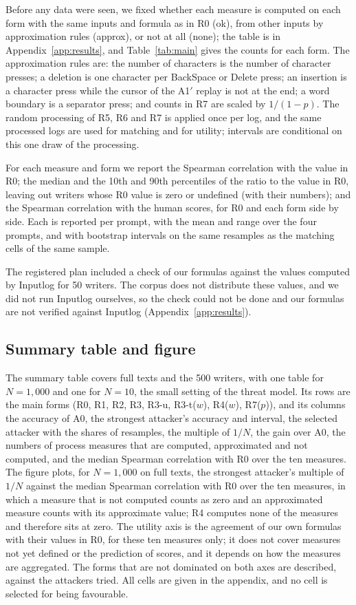 Before any data were seen, we fixed whether each measure is computed on each form with the same
inputs and formula as in R0 (ok), from other inputs by approximation rules (approx), or not at all (none); the table is in Appendix~\ref{app:results}, and Table~\ref{tab:main} gives the counts for each form. The
approximation rules are: the number of characters is the number of character presses; a deletion is one character per
BackSpace or Delete press; an insertion is a character press while the cursor of the A1$'$ replay is not at the end; a
word boundary is a separator press; and counts in R7 are scaled by $1/(1-p)$. The random processing of R5, R6 and R7
is applied once per log, and the same processed logs are used for matching and for utility; intervals are
conditional on this one draw of the processing.

For each measure and form we report the Spearman correlation with the value in R0; the median and the 10th and 90th
percentiles of the ratio to the value in R0, leaving out writers whose R0 value is zero or undefined (with their
numbers); and the Spearman correlation with the human scores, for R0 and each form side by side. Each is reported per
prompt, with the mean and range over the four prompts, and with bootstrap intervals on the same resamples as the
matching cells of the same sample.

The registered plan included a check of our formulas against the values computed by Inputlog for 50 writers. The corpus
does not distribute these values, and we did not run Inputlog ourselves, so the check could not be done and our
formulas are not verified against Inputlog (Appendix~\ref{app:results}).

\subsection{Summary table and figure}
\label{sec:protocol:summary}

The summary table covers full texts and the 500 writers, with one table for $N = 1{,}000$ and one for $N = 10$, the
small setting of the threat model. Its rows are the main forms (R0, R1, R2, R3, R3-u, R3-t($w$), R4($w$), R7($p$)), and
its columns the accuracy of A0, the strongest attacker's accuracy and interval, the selected attacker with the shares
of resamples, the multiple of $1/N$, the gain over A0, the numbers of process measures that are computed, approximated
and not computed, and the median Spearman correlation with R0 over the ten measures. The figure plots, for $N =
1{,}000$ on full texts, the strongest attacker's multiple of $1/N$ against the median Spearman correlation with R0 over
the ten measures, in which a measure that is not computed counts as zero and an approximated measure counts with its
approximate value; R4 computes none of the measures and therefore sits at zero. The utility axis is the agreement of
our own formulas with their values in R0, for these ten measures only; it does not cover measures not yet defined or
the prediction of scores, and it depends on how the measures are aggregated. The forms that are not dominated on both
axes are described, against the attackers tried. All cells are given in the appendix, and no cell is selected for being favourable.

